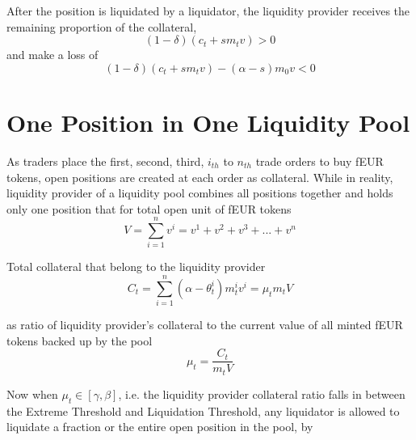 \documentclass{article}
\begin{document}
\begin{center}
\end{center}

After the position is liquidated by a liquidator, the liquidity provider receives the remaining proportion of the collateral, 
$$(1-\delta)(c_t+s m_t v)>0$$
and make a loss of
$$(1-\delta)(c_t+s m_t v) - (\alpha-s)m_0v<0$$

\section{One Position in One Liquidity Pool}
As traders place the first, second, third, $i_{th}$ to $n_{th}$ trade orders to buy fEUR tokens, open positions are created at each order as collateral. While in reality, liquidity provider of a liquidity pool combines all positions together and holds only one position that for total open unit of fEUR tokens
$$V=\sum_{i=1}^n v^i=v^1+v^2+v^3+...+v^n$$

Total collateral that belong to the liquidity provider
$$C_t=\sum_{i=1}^n (\alpha - \theta_t^i)m_t^i v^i=\mu_t m_t V$$

as ratio of liquidity provider's collateral to the current value of all minted fEUR tokens backed up by the pool
$$ \mu_t=\frac{C_t}{m_t V}$$

Now when $\mu_t \in [\gamma,\beta]$, i.e. the liquidity provider collateral ratio falls in between the Extreme Threshold and Liquidation Threshold, any liquidator is allowed to liquidate a fraction or the entire open position in the pool, by
\end{document}
